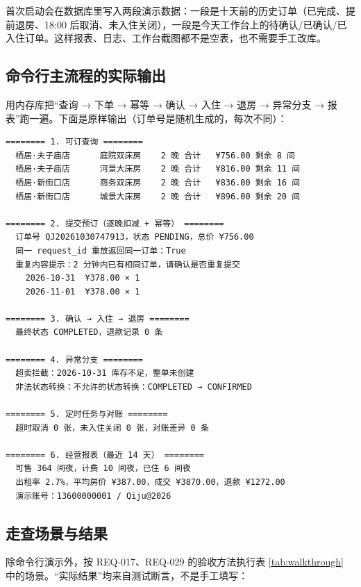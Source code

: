 \documentclass[UTF8,a4paper,zihao=-4]{ctexart}
\newcommand{\code}[1]{\texttt{\small\detokenize{#1}}}
\newcommand{\req}[1]{\textsf{\small #1}}
\begin{document}
首次启动会在数据库里写入两段演示数据：一段是十天前的历史订单（已完成、提前退房、18:00 后取消、未入住关闭），一段是今天工作台上的待确认/已确认/已入住订单。这样报表、日志、工作台截图都不是空表，也不需要手工改库。

\subsection{命令行主流程的实际输出}

\code{python -m qiju.cli demo} 用内存库把“查询 → 下单 → 幂等 → 确认 → 入住 → 退房 → 异常分支 → 报表”跑一遍。下面是原样输出（订单号是随机生成的，每次不同）：

\begin{tcolorbox}[enhanced, breakable, colback=paper, colframe=line, boxrule=0.4pt,
  left=8pt, right=8pt, top=6pt, bottom=6pt, arc=2pt, fontupper=\ttfamily\scriptsize]
\begin{verbatim}
======== 1. 可订查询 ========
  栖居·夫子庙店      庭院双床房    2 晚 合计   ¥756.00 剩余 8 间
  栖居·夫子庙店      河景大床房    2 晚 合计   ¥816.00 剩余 11 间
  栖居·新街口店      商务双床房    2 晚 合计   ¥836.00 剩余 16 间
  栖居·新街口店      城景大床房    2 晚 合计   ¥896.00 剩余 20 间

======== 2. 提交预订（逐晚扣减 + 幂等） ========
  订单号 QJ20261030747913，状态 PENDING，总价 ¥756.00
  同一 request_id 重放返回同一订单：True
  重复内容提示：2 分钟内已有相同订单，请确认是否重复提交
    2026-10-31  ¥378.00 × 1
    2026-11-01  ¥378.00 × 1

======== 3. 确认 → 入住 → 退房 ========
  最终状态 COMPLETED，退款记录 0 条

======== 4. 异常分支 ========
  超卖拦截：2026-10-31 库存不足，整单未创建
  非法状态转换：不允许的状态转换：COMPLETED → CONFIRMED

======== 5. 定时任务与对账 ========
  超时取消 0 张，未入住关闭 0 张，对账差异 0 条

======== 6. 经营报表（最近 14 天） ========
  可售 364 间夜，计费 10 间夜，已住 6 间夜
  出租率 2.7%，平均房价 ¥387.00，成交 ¥3870.00，退款 ¥1272.00
  演示账号：13600000001 / Qiju@2026
\end{verbatim}
\end{tcolorbox}

\subsection{走查场景与结果}

除命令行演示外，按 \req{REQ-017}、\req{REQ-029} 的验收方法执行表 \ref{tab:walkthrough} 中的场景。“实际结果”均来自测试断言，不是手工填写：
\end{document}
